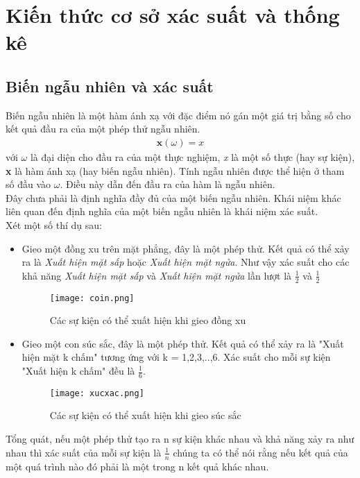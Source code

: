 \chapter{Kiến thức cơ sở xác suất và thống kê}\label{ch:1}
\section{Biến ngẫu nhiên và xác suất}\label{sec:1.1}
Biến ngẫu nhiên là một hàm ánh xạ với đặc điểm nó gán một giá trị bằng số cho kết quả đầu ra của một phép thử ngẫu nhiên.
\begin{align}
    \textbf{x}(\omega)=\textit{x}
\end{align}
với $\omega$ là đại diện cho đầu ra của một thực nghiệm, \textit{x} là một số thực (hay sự kiện), \textbf{x} là hàm ánh xạ (hay biến ngẫu nhiên).  
Tính ngẫu nhiên được thể hiện ở tham số đầu vào $\omega$. Điều này dẫn đến đầu ra của hàm là ngẫu nhiên.\\
Đây chưa phải là định nghĩa đầy đủ của một biến ngẫu nhiên. Khái niệm khác liên quan đến định nghĩa của một biến ngẫu nhiên là khái niệm xác suất. \\
Xét một số thí dụ sau:
\begin{itemize}
    \item Gieo một đồng xu trên mặt phẳng, đây là một phép thử. Kết quả có thể xảy ra là \textit{Xuất hiện mặt sấp} hoặc \textit{Xuất hiện mặt ngửa}. Như vậy xác suất cho các khả năng \textit{Xuất hiện mặt sấp} và \textit{Xuất hiện mặt ngửa} lần lượt là 
	$ \frac{1}{2} $ và $ \frac{1}{2} $
	\begin{figure}[H]
		\centering
		\texttt{[image: coin.png]}
		\caption{Các sự kiện có thể xuất hiện khi gieo đồng xu}
	   \end{figure}
    \item Gieo một con súc sắc, đây là một phép thử. Kết quả có thể xảy ra là "Xuất hiện mặt k chấm" tương ứng với k = 1,2,3,..,6. Xác suất cho mỗi sự kiện "Xuất hiện k chấm" đều là $ \frac{1}{6} $.
    \begin{figure}[H]
		\centering
		\texttt{[image: xucxac.png]}
		\caption{Các sự kiện có thể xuất hiện khi gieo súc sắc}
	   \end{figure}
\end{itemize}
Tổng quát, nếu một phép thử tạo ra n sự kiện khác nhau và khả năng xảy ra như nhau thì xác suất của mỗi sự kiện là $ \frac{1}{n} $
chúng ta có thể nói rằng nếu kết quả của một quá trình nào đó phải là một trong n kết quả khác nhau. 
\par
